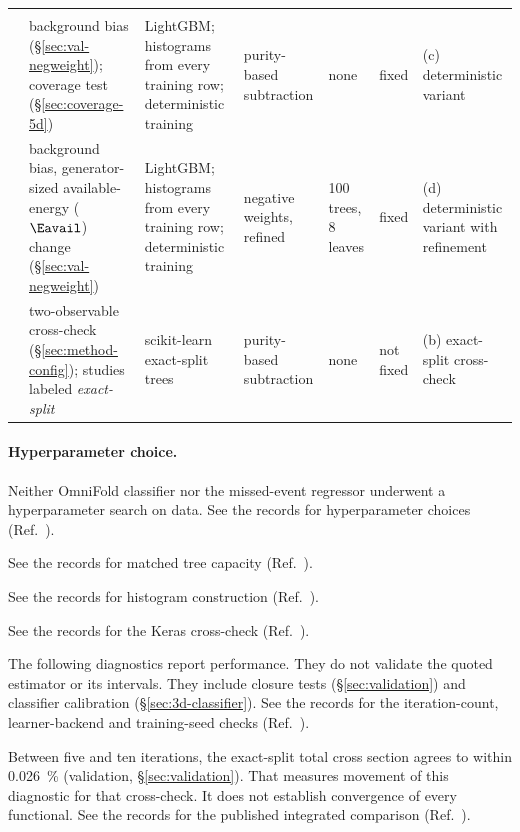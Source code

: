 \begin{table}[htbp]
\begin{tabular}{@{}p{}p{}p{}p{}p{}p{}p{}@{}}
    \addlinespace
    \multicolumn{7}{@{}l}{\emph{Diagnostic controls}} \\
    \hspace{0pt}\EstDetPurity{} & background bias (\S\ref{sec:val-negweight}); coverage test (\S\ref{sec:coverage-5d}) & LightGBM; histograms from every training row; deterministic training & purity-based subtraction & none & fixed & (c) deterministic variant \\
    \hspace{0pt}\EstLowCap{} & background bias, generator-sized available-energy ($\Eavail$) change (\S\ref{sec:val-negweight}) & LightGBM; histograms from every training row; deterministic training & negative weights, refined & 100 trees, 8 leaves & fixed & (d) deterministic variant with refinement \\
    \hspace{0pt}\EstExact{} & two-observable cross-check (\S\ref{sec:method-config}); studies labeled \emph{exact-split} & scikit-learn exact-split trees & purity-based subtraction & none & not fixed & (b) exact-split cross-check \\
    \bottomrule
  \end{tabular}
\end{table}

\paragraph{Hyperparameter choice.} Neither OmniFold classifier nor the missed-event regressor underwent a hyperparameter search on data. See the records for hyperparameter choices (Ref.~\cite{NoteRecords2026}).

See the records for matched tree capacity (Ref.~\cite{NoteRecords2026}).

See the records for histogram construction (Ref.~\cite{NoteRecords2026}).

See the records for the Keras cross-check (Ref.~\cite{NoteRecords2026}).

The following diagnostics report performance. They do not validate the quoted estimator or its intervals. They include closure tests (\S\ref{sec:validation}) and classifier calibration (\S\ref{sec:3d-classifier}). See the records for the iteration-count, learner-backend and training-seed checks (Ref.~\cite{NoteRecords2026}).

Between five and ten iterations, the exact-split total cross section agrees to within \SI{0.026}{\percent} (validation, \S\ref{sec:validation}). That measures movement of this diagnostic for that cross-check. It does not establish convergence of every functional. See the records for the published integrated comparison (Ref.~\cite{NoteRecords2026}).

